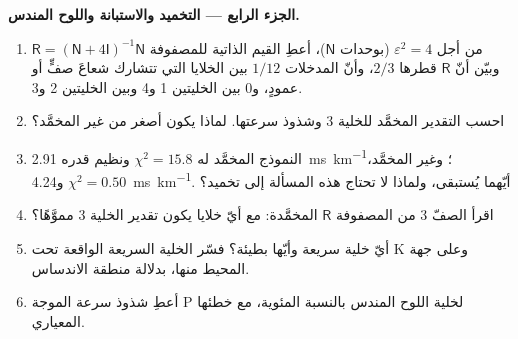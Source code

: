 \begin{problem}
\noindent\textbf{الجزء الرابع --- التخميد والاستبانة واللوح المندس.}
\begin{enumerate}[resume]
  \item من أجل $\varepsilon^2 = 4$ (بوحدات $\mathsf N$)، أعطِ
        القيم الذاتية للمصفوفة $\mathsf R = (\mathsf N + 4\mathsf I)^{-1}\mathsf N$
        وبيّن أنّ $\mathsf R$ قطرها $2/3$، وأنّ المدخلات $1/12$
        بين الخلايا التي تتشارك شعاعَ صفٍّ أو عمودٍ، و$0$ بين الخليتين 1
        و4 وبين الخليتين 2 و3.
  \item احسب التقدير المخمَّد للخلية 3 وشذوذ سرعتها. لماذا يكون
        أصغر من غير المخمَّد؟
  \item النموذج المخمَّد له $\chi^2 = 15.8$ ونظيم قدره \qty{2.91}{ms.km^{-1}}؛
        وغير المخمَّد، $\chi^2 = 0.50$ و\qty{4.24}{ms.km^{-1}}. أيّهما
        يُستبقى، ولماذا لا تحتاج هذه المسألة إلى تخميد؟
  \item اقرأ الصفّ 3 من المصفوفة $\mathsf R$ المخمَّدة: مع أيّ خلايا يكون
        تقدير الخلية 3 مموَّهًا؟
  \item أيّ خلية سريعة وأيّها بطيئة؟ فسّر الخلية السريعة الواقعة تحت
        K وعلى جهة المحيط منها، بدلالة منطقة الاندساس.
  \item أعطِ شذوذ سرعة الموجة P لخلية اللوح المندس بالنسبة المئوية، مع
        خطئها المعياري.
\end{enumerate}
\end{problem}
